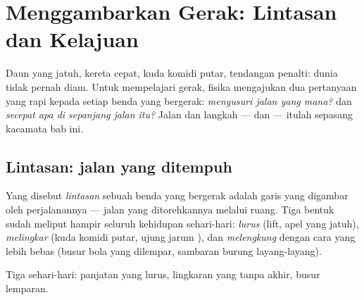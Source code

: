 \chapter{Menggambarkan Gerak: Lintasan dan Kelajuan}\label{ch:g6:describing-motion}

Daun yang jatuh, kereta cepat, kuda komidi putar, tendangan penalti:
dunia tidak pernah diam. Untuk mempelajari gerak, fisika mengajukan
dua pertanyaan yang rapi kepada setiap benda yang bergerak:
\emph{menyusuri jalan yang mana?} dan \emph{secepat apa di sepanjang
jalan itu?} Jalan dan langkah ---  dan  --- itulah
sepasang kacamata bab ini.

\section{Lintasan: jalan yang ditempuh}

\begin{definition}[Lintasan]\label{def:g6:describing-motion:trajectory}
Yang disebut \emph{lintasan} sebuah benda yang
bergerak adalah garis yang digambar oleh perjalanannya --- jalan yang
ditorehkannya melalui ruang. Tiga bentuk sudah meliput hampir seluruh
kehidupan sehari-hari: \emph{lurus} (lift, apel
yang jatuh), \emph{melingkar} (kuda komidi
putar, ujung jarum ), dan \emph{melengkung} dengan cara yang lebih
bebas (busur bola yang dilempar, sambaran burung layang-layang).
\end{definition}

\begin{omfigure}

{\small Tiga  sehari-hari: panjatan yang lurus, lingkaran yang
tanpa akhir, busur lemparan.}
\end{omfigure}

